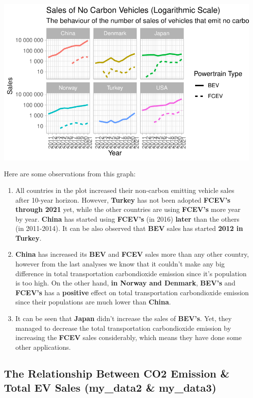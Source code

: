 \documentclass[
  11pt,
  a4paper,
  DIV=11,
  numbers=noendperiod]{scrartcl}
\begin{document}
\includegraphics{analysis_files/figure-pdf/unnamed-chunk-14-1.pdf}

Here are some observations from this graph:

\begin{enumerate}
\def\labelenumi{\arabic{enumi}.}
\item
  All countries in the plot increased their non-carbon emitting vehicle
  sales after 10-year horizon. However, \textbf{Turkey} has not been
  adopted \textbf{FCEV's through 2021} yet, while the other countries
  are using \textbf{FCEV's} more year by year. \textbf{China} has
  started using \textbf{FCEV's} (in 2016) \textbf{later} than the others
  (in 2011-2014). It can be also observed that \textbf{BEV} sales has
  started \textbf{2012 in Turkey}.
\item
  \textbf{China} has increased its \textbf{BEV} and \textbf{FCEV} sales
  more than any other country, however from the last analyses we know
  that it couldn't make any big difference in total transportation
  carbondioxide emission since it's population is too high. On the other
  hand, \textbf{in Norway and Denmark}, \textbf{BEV's} and
  \textbf{FCEV's} has a \textbf{positive} effect on total transportation
  carbondioxide emission since their populations are much lower than
  \textbf{China}.
\item
  It can be seen that \textbf{Japan} didn't increase the sales of
  \textbf{BEV's}. Yet, they managed to decrease the total transportation
  carbondioxide emission by increasing the \textbf{FCEV} sales
  considerably, which means they have done some other applications.
\end{enumerate}

\subsection{The Relationship Between CO2 Emission \& Total EV Sales
(my\_data2 \&
my\_data3)}\label{the-relationship-between-co2-emission-total-ev-sales-my_data2-my_data3}
\end{document}
